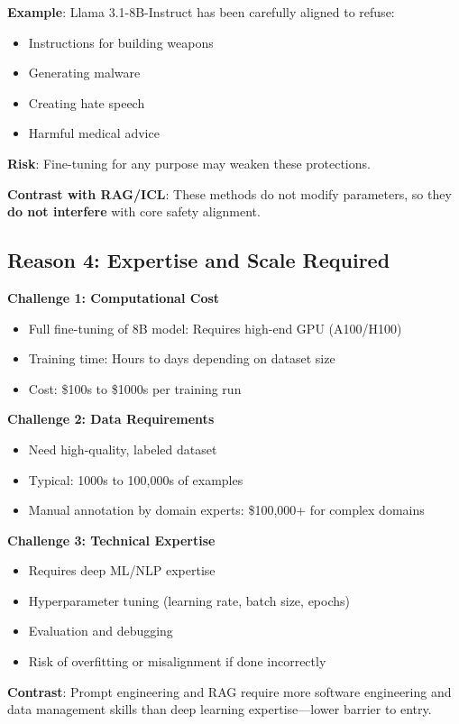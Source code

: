 \documentclass{article}
\begin{document}
\textbf{Example}: Llama 3.1-8B-Instruct has been carefully aligned to refuse:
\begin{itemize}
\item Instructions for building weapons
\item Generating malware
\item Creating hate speech
\item Harmful medical advice
\end{itemize}

\textbf{Risk}: Fine-tuning for any purpose may weaken these protections.

\textbf{Contrast with RAG/ICL}: These methods do not modify parameters, so they \textbf{do not interfere} with core safety alignment.

\subsection{Reason 4: Expertise and Scale Required}

\textbf{Challenge 1: Computational Cost}
\begin{itemize}
\item Full fine-tuning of 8B model: Requires high-end GPU (A100/H100)
\item Training time: Hours to days depending on dataset size
\item Cost: \$100s to \$1000s per training run
\end{itemize}

\textbf{Challenge 2: Data Requirements}
\begin{itemize}
\item Need high-quality, labeled dataset
\item Typical: 1000s to 100,000s of examples
\item Manual annotation by domain experts: \$100,000+ for complex domains
\end{itemize}

\textbf{Challenge 3: Technical Expertise}
\begin{itemize}
\item Requires deep ML/NLP expertise
\item Hyperparameter tuning (learning rate, batch size, epochs)
\item Evaluation and debugging
\item Risk of overfitting or misalignment if done incorrectly
\end{itemize}

\textbf{Contrast}: Prompt engineering and RAG require more software engineering and data management skills than deep learning expertise---lower barrier to entry.
\end{document}
